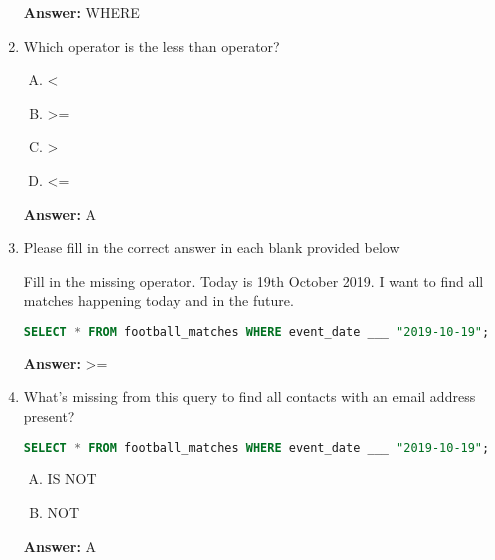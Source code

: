 \documentclass[12pt]{article}
\begin{document}
\begin{enumerate}[1.]
    \bigskip

    \textbf{Answer:} WHERE

    \item

    Which operator is the less than operator?

    \bigskip

    \begin{enumerate}[A.]
        \item <
        \item >=
        \item >
        \item <=
    \end{enumerate}

    \bigskip

    \textbf{Answer:} A

    \item

    Please fill in the correct answer in each blank provided below

    \bigskip

    Fill in the missing operator. Today is 19th October 2019. I want to find all
    matches happening today and in the future.

    \bigskip

    \begin{lstlisting}[language=SQL]
    SELECT * FROM football_matches WHERE event_date ___ "2019-10-19";
    \end{lstlisting}

    \bigskip

    \textbf{Answer:} >=

    \item

    What's missing from this query to find all contacts with an email address
    present?

    \bigskip

    \begin{lstlisting}[language=SQL]
    SELECT * FROM football_matches WHERE event_date ___ "2019-10-19";
    \end{lstlisting}

    \begin{enumerate}[A.]
        \item IS NOT
        \item NOT
    \end{enumerate}

    \bigskip

    \textbf{Answer:} A


\end{enumerate}
\end{document}
